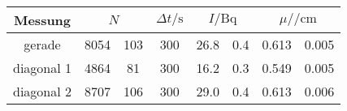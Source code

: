 \label{tab:tabWürfel2}
	\begin{tabular}{cS[table-format=4.0]@{${}\pm{}$}S[table-format=3.0]S[table-format=3.0]S[table-format=2.1]@{${}\pm{}$}S[table-format=1.1]S[table-format=1.3]@{${}\pm{}$}S[table-format=1.3]}
		\toprule
		{Messung} &  & {$\Delta t/\si{\second}$} &  &  \\
		\midrule
		 {gerade}     & 8054 & 103 & 300 & 26.8 & 0.4 & 0.613 & 0.005 \\
		 {diagonal 1} & 4864 & 81  & 300 & 16.2 & 0.3 & 0.549 & 0.005 \\
		 {diagonal 2} & 8707 & 106 & 300 & 29.0 & 0.4 & 0.613 & 0.006 \\
		\bottomrule
	\end{tabular}
